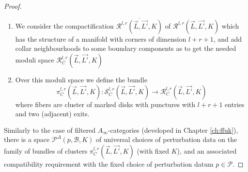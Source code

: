 \begin{proof}
\begin{enumerate}
	\item We consider the compactification $\overline{\mathcal{R}^{l,r}(\vec{L},\vec{L'},K)}$ of $\mathcal{R}^{l,r}(\vec{L},\vec{L'},K)$ which has the structure of a manifold with corners
of dimension $l+r+1$, and add collar neighbourhoods to some boundary components as \cite[p. 14]{Amb:fil-fuk} to get the needed moduli space  $\mathcal{R}_C^{l,r}(\vec{L},\vec{L'},K)$
	\item Over this moduli space we define the bundle $$\pi_C^{l,r}(\vec{L},\vec{L'},K)\colon \mathcal{S}_C^{l,r}(\vec{L},\vec{L'},K)\to \mathcal{R}_C^{l,r}(\vec{L},\vec{L'},K)$$ where fibers are cluster of marked disks with punctures with $l+r+1$ entries and two (adjacent) exits.
\end{enumerate}
Similarly to the case of filtered $A_\infty$-categories (developed in Chapter \ref{ch:ffuk}), there is a space $\mathcal{P}^{\Delta}(p,\mathcal{B},K)$ of universal choices of perturbation data on the family of bundles of clusters $\pi_C^{l,r}(\vec{L},\vec{L'},K)$ (with fixed $K$), and an associated compatibility requirement with the fixed choice of perturbation datum $p\in \mathcal{P}$. 


\end{proof}
